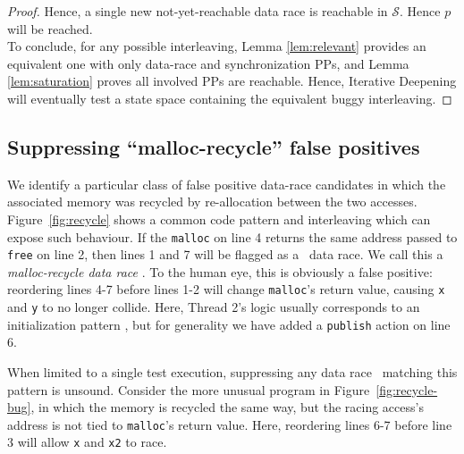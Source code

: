 \begin{proof}
Hence, a single new not-yet-reachable data race is reachable in $\mathcal{S}$. Hence $p$ will be reached.
\\

To conclude,
for any possible interleaving, Lemma \ref{lem:relevant} provides an equivalent one with only data-race and synchronization PPs,
and Lemma \ref{lem:saturation} proves all involved PPs are reachable.
Hence, Iterative Deepening will eventually test a state space containing the equivalent buggy interleaving.
\end{proof}


\subsection{Suppressing ``malloc-recycle'' false positives}
\label{sec:recycle}

We identify a particular class of false positive data-race candidates in which the associated memory was recycled by re-allocation between the two accesses.
Figure~\ref{fig:recycle} shows a common code pattern and interleaving which can expose such behaviour.
If the {\tt malloc} on line 4 returns the same address passed to {\tt free} on line 2, then lines 1 and 7 will be flagged as a ~data race.
We call this a {\em malloc-recycle data race }.
To the human eye, this is obviously a false positive: reordering lines 4-7 before lines 1-2 will change {\tt malloc}'s return value, causing {\tt x} and {\tt y} to no longer collide.
Here, Thread 2's logic usually corresponds to an initialization pattern \cite{eraser}, but for generality we have added a {\tt publish} action on line 6.

When limited to a single test execution, suppressing any data race ~matching this pattern is unsound.
Consider the more unusual program in Figure~\ref{fig:recycle-bug},
in which the memory is recycled the same way, but the racing access's address is not tied to {\tt malloc}'s return value.
Here, reordering lines 6-7 before line 3 will allow {\tt x} and {\tt x2} to race.

